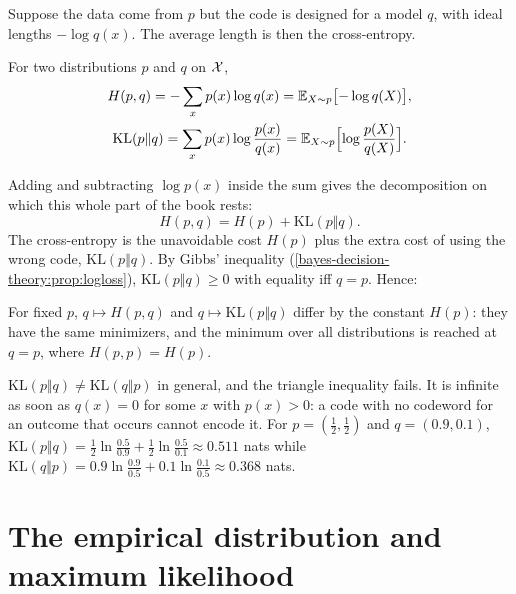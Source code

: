 \begin{notechapter}
Suppose the data come from $p$ but the code is designed for a model $q$, with
ideal lengths $-\log q(x)$. The average length is then the cross-entropy.

\begin{definition}\label{cross-entropy:def:ce}
For two distributions $p$ and $q$ on $\mathcal{X}$,
\begin{gather*}
  H(p, q) = -\sum_xp(x)\log q(x) = \mathbb{E}_{X\sim p}\bigl[-\log q(X)\bigr],\\
  \mathrm{KL}(p\Vert q) = \sum_xp(x)\log\frac{p(x)}{q(x)} = \mathbb{E}_{X\sim p}\Bigl[\log\frac{p(X)}{q(X)}\Bigr].
\end{gather*}
\end{definition}

Adding and subtracting $\log p(x)$ inside the sum gives the decomposition on which
this whole part of the book rests:
\begin{equation}\label{cross-entropy:eq:decomposition}
  H(p, q) = H(p) + \mathrm{KL}(p\Vert q).
\end{equation}
The cross-entropy is the unavoidable cost $H(p)$ plus the extra cost of using the
wrong code, $\mathrm{KL}(p\Vert q)$. By Gibbs' inequality
(\cref{bayes-decision-theory:prop:logloss}), $\mathrm{KL}(p\Vert q)\geq0$ with equality iff
$q = p$. Hence:

\begin{keyidea}
For fixed $p$, $q\mapsto H(p,q)$ and $q\mapsto\mathrm{KL}(p\Vert q)$ differ by the constant $H(p)$:
they have the same minimizers, and the minimum over all distributions is reached
at $q = p$, where $H(p, p) = H(p)$.
\end{keyidea}

\begin{pitfall}
$\mathrm{KL}(p\Vert q)\neq\mathrm{KL}(q\Vert p)$ in general, and the triangle inequality fails. It
is infinite as soon as $q(x) = 0$ for some $x$ with $p(x)>0$: a code with no codeword
for an outcome that occurs cannot encode it. For $p = (\frac12,\frac12)$ and $q = (0.9, 0.1)$,
$\mathrm{KL}(p\Vert q) = \frac12\ln\frac{0.5}{0.9} + \frac12\ln\frac{0.5}{0.1}\approx0.511$ nats while
$\mathrm{KL}(q\Vert p) = 0.9\ln\frac{0.9}{0.5} + 0.1\ln\frac{0.1}{0.5}\approx0.368$ nats.
\end{pitfall}

\section{The empirical distribution and maximum likelihood}\label{cross-entropy:sec:mle}


\end{notechapter}
